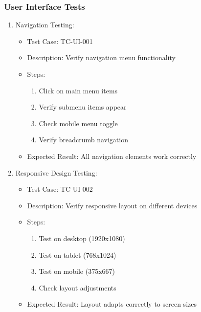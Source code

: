 \subsubsection{User Interface Tests}
\begin{enumerate}
    \item Navigation Testing:
    \begin{itemize}
        \item Test Case: TC-UI-001
        \item Description: Verify navigation menu functionality
        \item Steps:
        \begin{enumerate}
            \item Click on main menu items
            \item Verify submenu items appear
            \item Check mobile menu toggle
            \item Verify breadcrumb navigation
        \end{enumerate}
        \item Expected Result: All navigation elements work correctly
    \end{itemize}

    \item Responsive Design Testing:
    \begin{itemize}
        \item Test Case: TC-UI-002
        \item Description: Verify responsive layout on different devices
        \item Steps:
        \begin{enumerate}
            \item Test on desktop (1920x1080)
            \item Test on tablet (768x1024)
            \item Test on mobile (375x667)
            \item Check layout adjustments
        \end{enumerate}
        \item Expected Result: Layout adapts correctly to screen sizes
    \end{itemize}
\end{enumerate}


